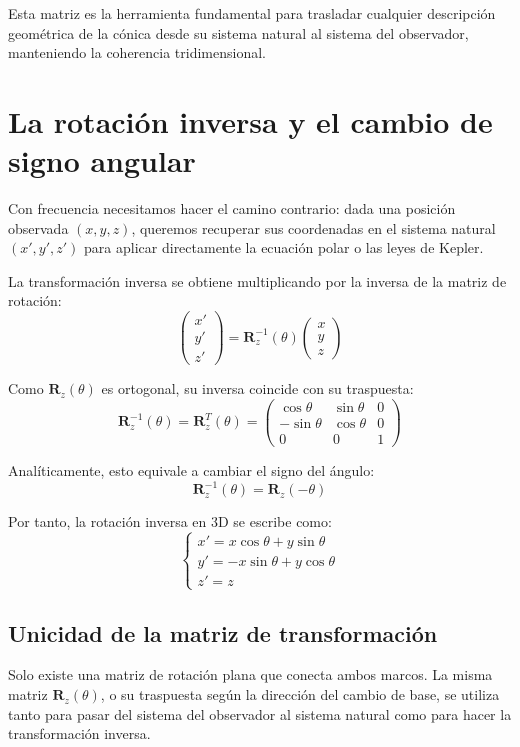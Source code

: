 Esta matriz es la herramienta fundamental para trasladar cualquier descripción geométrica de la cónica desde su sistema natural al sistema del observador, manteniendo la coherencia tridimensional.

\section{La rotación inversa y el cambio de signo angular}
Con frecuencia necesitamos hacer el camino contrario: dada una posición observada $(x,y,z)$, queremos recuperar sus coordenadas en el sistema natural $(x',y',z')$ para aplicar directamente la ecuación polar o las leyes de Kepler.

La transformación inversa se obtiene multiplicando por la inversa de la matriz de rotación:
$$ \begin{pmatrix} x' \\ y' \\ z' \end{pmatrix} = \mathbf{R}_z^{-1}(\theta)\begin{pmatrix} x \\ y \\ z \end{pmatrix} $$

Como $\mathbf{R}_z(\theta)$ es ortogonal, su inversa coincide con su traspuesta:
$$ \mathbf{R}_z^{-1}(\theta) = \mathbf{R}_z^T(\theta) = \begin{pmatrix} 
\cos\theta & \sin\theta & 0 \\ 
-\sin\theta & \cos\theta & 0 \\ 
0 & 0 & 1 
\end{pmatrix} $$

Analíticamente, esto equivale a cambiar el signo del ángulo:
$$ \mathbf{R}_z^{-1}(\theta) = \mathbf{R}_z(-\theta) $$

Por tanto, la rotación inversa en 3D se escribe como:
$$ \begin{cases} 
 x' = x\cos\theta + y\sin\theta \\ 
 y' = -x\sin\theta + y\cos\theta \\ 
 z' = z 
\end{cases} $$

\subsection{Unicidad de la matriz de transformación}
Solo existe una matriz de rotación plana que conecta ambos marcos. La misma matriz \(\mathbf{R}_z(\theta)\), o su traspuesta según la dirección del cambio de base, se utiliza tanto para pasar del sistema del observador al sistema natural como para hacer la transformación inversa.

